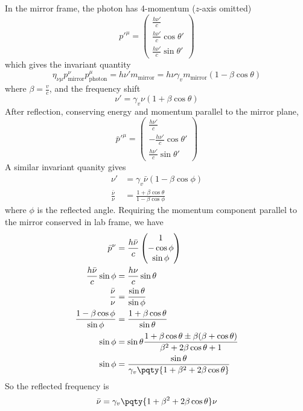 \documentclass[12pt]{article}
\begin{document}
        \subsection{} In the mirror frame, the photon has 4-momentum (\(z\)-axis omitted)\[
            p'^\mu =\begin{pmatrix} \frac{h\nu'}{c} \\  \frac{h\nu'}{c}\cos\theta'\\  \frac{h\nu'}{c}\sin \theta' \end{pmatrix} 
        \]
        which gives the invariant quantity \[
            \eta_{\nu\mu} p^\nu_{\text{mirror}}p^\mu_{\text{photon}} = h \nu' m_\text{mirror}= h \nu \gamma_v m_\text{mirror}(1- \beta \cos\theta)
        \]
        where \(\beta = \frac{v}{c}\), and the frequency shift
        \[
            \nu' = \gamma_v \nu (1 + \beta \cos\theta)
        \]
        After reflection, conserving energy and momentum parallel to the mirror plane,
        \[
            \bar{p}'^\mu =\begin{pmatrix} \frac{h\nu'}{c} \\-  \frac{h\nu'}{c}\cos\theta'\\  \frac{h\nu'}{c}\sin \theta' \end{pmatrix} 
        \]
        A similar invariant quanity gives
        \begin{align*}
            \nu' &=  \gamma_v \bar{\nu}(1 - \beta \cos\phi)\\
            \frac{\bar{\nu}}{\nu} &=  \frac{1 + \beta \cos\theta}{1 - \beta \cos\phi} 
        \end{align*}
        where \(\phi\) is the reflected angle. Requiring the momentum component parallel to the mirror conserved in lab frame, we have \begin{align*}
            \bar{p}^\nu &=  \frac{h\bar{\nu}}{c}\begin{pmatrix} 1\\- \cos\phi \\ \sin\phi \end{pmatrix} \\
            \frac{h\bar{\nu}}{c} \sin \phi &=  \frac{h\nu}{c}\sin \theta\\
            \frac{\bar{\nu}}{\nu} &= \frac{\sin\theta}{\sin\phi} \\
            \frac{1 - \beta \cos\phi}{\sin\phi} &= \frac{1 + \beta \cos\theta}{\sin \theta}\\
            \sin \phi &= \sin\theta \frac{{1 + \beta \cos\theta} \pm \beta (\beta + \cos\theta)}{\beta^2 + 2 \beta \cos\theta + 1} \\
            \sin \phi &= \frac{\sin \theta}{\gamma_v\pqty{1 +\beta^2 + 2 \beta \cos\theta}}
        \end{align*}
        So the reflected frequency is \[
            \bar{\nu} = \gamma_v\pqty{1 +\beta^2 + 2 \beta \cos\theta}\nu 
        \]
\end{document}
